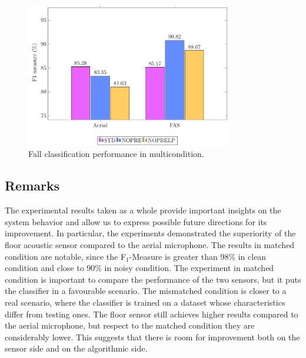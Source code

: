 \begin{figure}[t]
	\centering
	\includegraphics[width=0.8\textwidth]{img/pgfsources/16_multicondition/16_multicondition}
	\caption{Fall classification performance in multicondition.} \label{fig:results_multi}
\end{figure}

\subsection{Remarks}
The experimental results taken as a whole provide important insights on the system behavior and allow us to express possible future directions for its improvement. In particular, the experiments demonstrated the superiority of the floor acoustic sensor compared to the aerial microphone. The results in matched condition are notable, since the F$_1$-Measure is greater than 98\% in clean condition and close to 90\% in noisy condition. The experiment in matched condition is important to compare the performance of the two sensors, but it puts the classifier in a favourable scenario. The mismatched condition is closer to a real scenario, where the classifier is trained on a dataset whose characteristics differ from testing ones. The floor sensor still achieves higher results compared to the aerial microphone, but respect to the matched condition they are considerably lower. This suggests that there is room for improvement both on the sensor side and on the algorithmic side.

